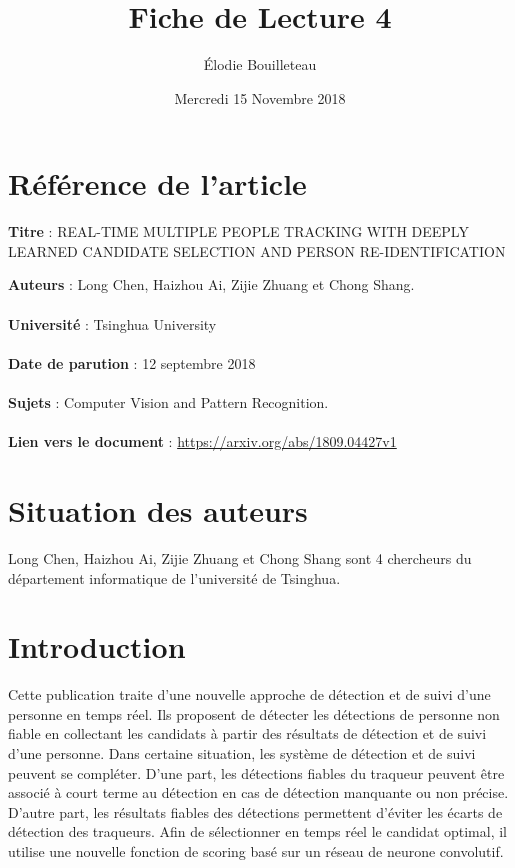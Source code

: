 \documentclass[11pt]{report}
\title{Fiche de Lecture 4}
\author{Élodie Bouilleteau}
\date{Mercredi 15 Novembre 2018}
\begin{document}
\maketitle
\renewcommand{\thesection}{\arabic{section}} 

\section{Référence de l'article}
	\begin{flushleft}
		\textbf{Titre} : REAL-TIME MULTIPLE PEOPLE TRACKING WITH DEEPLY LEARNED CANDIDATE SELECTION AND PERSON RE-IDENTIFICATION
	\end{flushleft}
	\textbf{Auteurs} : Long Chen, Haizhou Ai, Zijie Zhuang et Chong Shang.\\\\
	\textbf{Université} :  Tsinghua University\\\\
	\textbf{Date de parution} : 12 septembre 2018\\\\
	\textbf{Sujets} : Computer Vision and Pattern Recognition.\\\\
	\textbf{Lien vers le document} : \url{https://arxiv.org/abs/1809.04427v1}
	
\section{Situation des auteurs}
Long Chen, Haizhou Ai, Zijie Zhuang et Chong Shang sont 4 chercheurs du département informatique de l'université de Tsinghua.

\section{Introduction}
Cette publication traite d'une nouvelle approche de détection et de suivi d'une personne en temps réel. Ils proposent de détecter les détections de personne non fiable en collectant les candidats à partir des résultats de détection et de suivi d'une personne. Dans certaine situation, les système de détection et de suivi peuvent se compléter. D'une part, les détections fiables du traqueur peuvent être associé à court terme au détection en cas de détection manquante ou non précise.
D'autre part, les résultats fiables des détections permettent d'éviter les écarts de détection des traqueurs. 
Afin de sélectionner en temps réel le candidat optimal, il utilise une nouvelle fonction de scoring basé sur un réseau de neurone convolutif.
\end{document}
